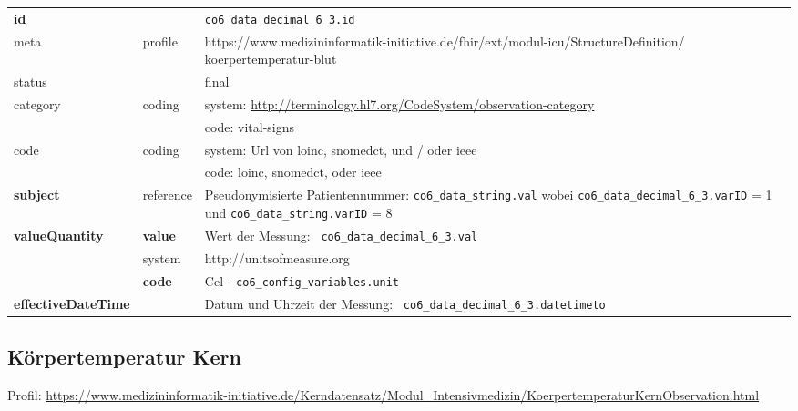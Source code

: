 \begin{longtable}{|l|l|p{7.5cm}|}
        \hline
        \rowcolor{lightgray} \multicolumn{3}{|l|}{Data Mapping (inhaltlich)} \\ \hline
        \textbf{id} &  & \texttt{co6\_data\_decimal\_6\_3.id} \\ \hline
	meta & profile & https://www.medizininformatik-initiative.de/fhir/ext/modul-icu/StructureDefinition/ koerpertemperatur-blut \\ \hline 
	status &  & final   \\ \hline 
	category & coding & system: \url{http://terminology.hl7.org/CodeSystem/observation-category} \\
\cline{3-3}
	& & code: vital-signs \\ \hline
	code & coding & system: Url von \ac{loinc}, \ac{snomedct}, und / oder \ac{ieee} \\ 
	\cline{3-3} 
	 &  & code: \ac{loinc}, \ac{snomedct}, oder \ac{ieee} \\ \hline
	 \textbf{subject} & reference & Pseudonymisierte Patientennummer: \texttt{co6\_data\_string.val} wobei \texttt{co6\_data\_decimal\_6\_3.varID} = 1 und \texttt{co6\_data\_string.varID} = 8 \\ \hline
	 \textbf{valueQuantity}  & \textbf{value} & Wert der Messung: \texttt{
co6\_data\_decimal\_6\_3.val} \\
        \cline{2-3}
         & system & http://unitsofmeasure.org \\
         \cline{2-3}
         & \textbf{code} & Cel - \texttt{co6\_config\_variables.unit} \\ \hline
     \textbf{effectiveDateTime}  & & Datum und Uhrzeit der Messung: \texttt{
co6\_data\_decimal\_6\_3.datetimeto} \\ \hline
\end{longtable}

\subsection{Körpertemperatur Kern} 
Profil: \url{https://www.medizininformatik-initiative.de/Kerndatensatz/Modul_Intensivmedizin/KoerpertemperaturKernObservation.html}

